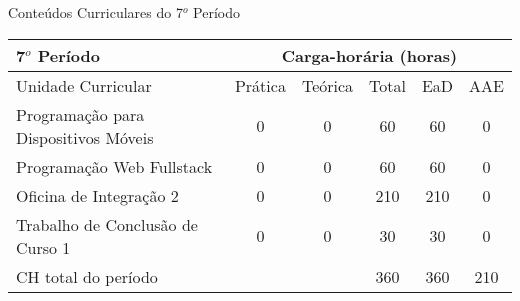 \begin{quadro}[ht!]
\centering
\caption{Conteúdos Curriculares do 7$^o$ Período}\label{qua:periodo7}
\begin{tabular}{|p{8.0cm}|c|c|c|c|c|}
\hline
\rowcolor{blue1} 7$^o$ Período & \multicolumn{5}{|c|}{\centering Carga-horária (horas)} \\ \hline
\rowcolor{blue1} Unidade Curricular & Prática & Teórica & Total & EaD & AAE \\ \hline
Programação para Dispositivos Móveis & 0 & 0 & 60 & 60	&	0 \\	\hline
Programação Web Fullstack & 0 & 0 & 60 & 60	&	0 \\	\hline
Oficina de Integração 2 & 0 & 0 & 210 & 210	&	0 \\	\hline
Trabalho de Conclusão de Curso 1 & 0 & 0 & 30 & 30	&	0 \\	\hline
CH total do período & \multicolumn{2}{p{3.3cm}|}{\cellcolor{blue1}} & 360 & 360	&	210 \\ \hline
\end{tabular} \end{quadro}